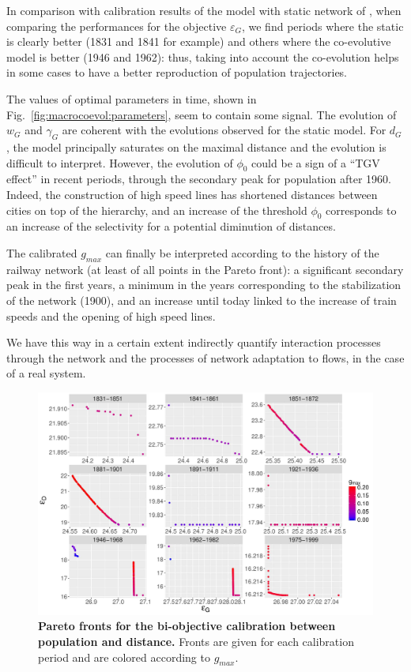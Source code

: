 In comparison with calibration results of the model with static network of \cite{raimbault2018indirect}, when comparing the performances for the objective $\varepsilon_G$, we find periods where the static is clearly better (1831 and 1841 for example) and others where the co-evolutive model is better (1946 and 1962): thus, taking into account the co-evolution helps in some cases to have a better reproduction of population trajectories.


The values of optimal parameters in time, shown in Fig.~\ref{fig:macrocoevol:parameters}, seem to contain some signal. The evolution of $w_G$ and $\gamma_G$ are coherent with the evolutions observed for the static model. For $d_G$, the model principally saturates on the maximal distance and the evolution is difficult to interpret. However, the evolution of $\phi_0$ could be a sign of a ``TGV effect'' in recent periods, through the secondary peak for population after 1960. Indeed, the construction of high speed lines has shortened distances between cities on top of the hierarchy, and an increase of the threshold $\phi_0$ corresponds to an increase of the selectivity for a potential diminution of distances.


The calibrated $g_{max}$ can finally be interpreted according to the history of the railway network (at least of all points in the Pareto front): a significant secondary peak in the first years, a minimum in the years corresponding to the stabilization of the network (1900), and an increase until today linked to the increase of train speeds and the opening of high speed lines. 


We have this way in a certain extent indirectly quantify interaction processes through the network and the processes of network adaptation to flows, in the case of a real system.


\begin{figure}
	\includegraphics[width=\linewidth]{figures/6-2-3-fig-macrocoevol-pareto.jpg}
	\caption[Pareto fronts for the calibration on population and distance]{\textbf{Pareto fronts for the bi-objective calibration between population and distance.} Fronts are given for each calibration period and are colored according to $g_{max}$.\label{fig:macrocoevol:pareto}}
\end{figure}




